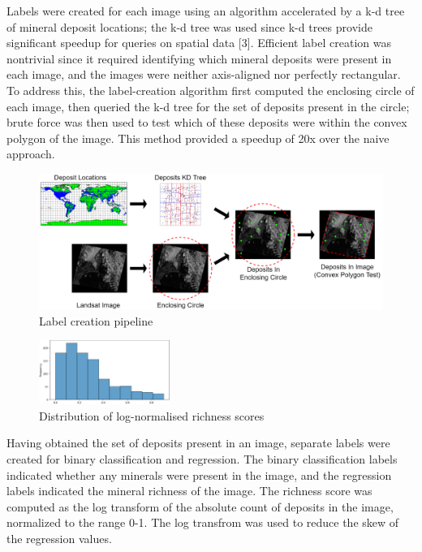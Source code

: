 \documentclass[10pt]{article}
\begin{document}

Labels were created for each image using an algorithm accelerated by a
k-d tree of mineral deposit locations; the k-d tree was used since k-d trees
provide significant speedup for queries on spatial data [3]. Efficient label creation
was nontrivial since it required identifying which mineral deposits were present
in each image, and the images were neither axis-aligned nor perfectly rectangular.
To address this, the label-creation algorithm first computed the enclosing circle
of each image, then queried the k-d tree for the set of deposits present in the circle;
brute force was then used to test which of these deposits were within the convex
polygon of the image. This method provided a speedup of 20x over the naive approach.

\begin{figure}[ht]
  \centering
  \includegraphics[width=\linewidth]{label-creation.png}
  \caption{Label creation pipeline}
  \label{fig:2}
\end{figure}

\begin{figure}
  \centering
  \includegraphics[width=0.38\textwidth]{good_histo.png}
  \caption{Distribution of log-normalised richness scores}
  \label{fig:histogram}
\end{figure}

Having obtained the set of deposits present in an image, separate labels were
created for binary classification and regression. The binary classification labels
indicated whether any minerals were present in the image, and the regression labels
indicated the mineral richness of the image. The richness score was computed as the
log transform of the absolute count of deposits in the image, normalized to the range 0-1.
The log transfrom was used to reduce the skew of the regression values.
\end{document}
